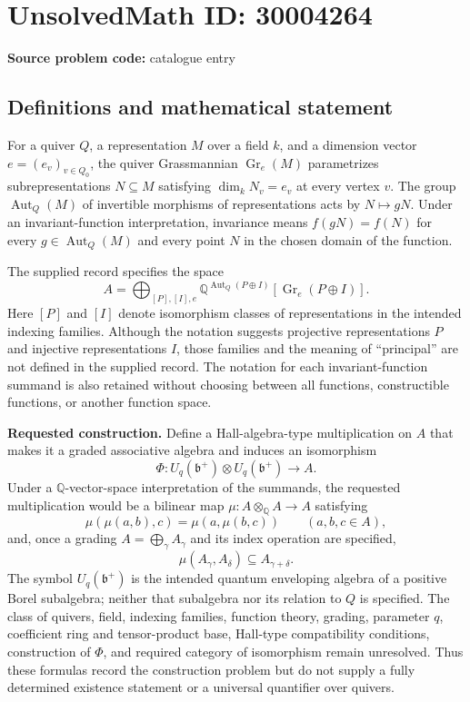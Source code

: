 \documentclass[11pt]{article}
\begin{document}
\section*{UnsolvedMath ID: 30004264}
\textbf{Source problem code:} catalogue entry
\subsection{Definitions and mathematical statement}
For a quiver \(Q\), a representation \(M\) over a field \(k\), and a dimension vector \(e=(e_v)_{v\in Q_0}\), the quiver Grassmannian \(\operatorname{Gr}_e(M)\) parametrizes subrepresentations \(N\subseteq M\) satisfying \(\dim_k N_v=e_v\) at every vertex \(v\). The group \(\operatorname{Aut}_Q(M)\) of invertible morphisms of representations acts by \(N\mapsto gN\). Under an invariant-function interpretation, invariance means \(f(gN)=f(N)\) for every \(g\in\operatorname{Aut}_Q(M)\) and every point \(N\) in the chosen domain of the function.

The supplied record specifies the space
\[
 A=\bigoplus_{[P],[I],e}
 \mathbb{Q}^{\operatorname{Aut}_Q(P\oplus I)}
 [\operatorname{Gr}_e(P\oplus I)].
\]
Here \([P]\) and \([I]\) denote isomorphism classes of representations in the intended indexing families. Although the notation suggests projective representations \(P\) and injective representations \(I\), those families and the meaning of ``principal'' are not defined in the supplied record. The notation for each invariant-function summand is also retained without choosing between all functions, constructible functions, or another function space.

\textbf{Requested construction.} Define a Hall-algebra-type multiplication on \(A\) that makes it a graded associative algebra and induces an isomorphism
\[
 \Phi:U_q(\mathfrak b^+)\otimes U_q(\mathfrak b^+)
 \longrightarrow A.
\]
Under a \(\mathbb Q\)-vector-space interpretation of the summands, the requested multiplication would be a bilinear map \(\mu:A\otimes_{\mathbb Q}A\to A\) satisfying
\[
 \mu(\mu(a,b),c)=\mu(a,\mu(b,c))
 \qquad(a,b,c\in A),
\]
and, once a grading \(A=\bigoplus_\gamma A_\gamma\) and its index operation are specified,
\[
 \mu(A_\gamma,A_\delta)\subseteq A_{\gamma+\delta}.
\]
The symbol \(U_q(\mathfrak b^+)\) is the intended quantum enveloping algebra of a positive Borel subalgebra; neither that subalgebra nor its relation to \(Q\) is specified. The class of quivers, field, indexing families, function theory, grading, parameter \(q\), coefficient ring and tensor-product base, Hall-type compatibility conditions, construction of \(\Phi\), and required category of isomorphism remain unresolved. Thus these formulas record the construction problem but do not supply a fully determined existence statement or a universal quantifier over quivers.
\end{document}
